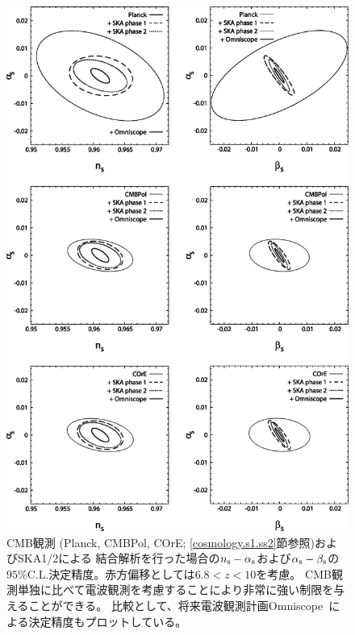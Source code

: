 \begin{enumerate}
\begin{figure}
\begin{center}
\includegraphics[width=120mm,clip]{cosmology/CMB+21cm_v2.eps}
\caption{
CMB観測 (Planck, CMBPol, COrE; \ref{cosmology.s1.ss2}節参照)およびSKA1/2による
結合解析を行った場合の$n_{\rm s}-\alpha_{\rm s}$および$\alpha_{\rm s}-\beta_{\rm s}$の
$95\%$C.L.決定精度。赤方偏移としては$6.8<z<10$を考慮。
CMB観測単独に比べて電波観測を考慮することにより非常に強い制限を与えることができる。
比較として、将来電波観測計画Omniscope~\citep{Tegmark:2009kv}による決定精度もプロットしている。
}
\label{fig:CMB+21cm_v2}
\end{center}
\end{figure}


\end{enumerate}
